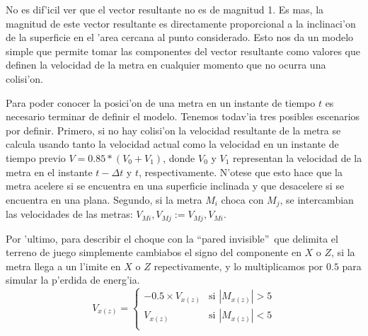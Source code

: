 \documentclass[10pt,letterpaper]{article}
\begin{document}
No es dif'icil ver que el vector resultante no es de magnitud 1. Es
mas, la magnitud de este vector resultante es directamente
proporcional a la inclinaci'on de la superficie en el 'area cercana al
punto considerado. Esto nos da un modelo simple que permite tomar las
componentes del vector resultante como valores que definen la
velocidad de la metra en cualquier momento que no ocurra una colisi'on.

Para poder conocer la posici'on de una metra en un instante de tiempo
$t$ es necesario terminar de definir el modelo. Tenemos todav'ia tres
posibles escenarios por definir. Primero, si no hay colisi'on la
velocidad resultante de la metra se calcula usando tanto la velocidad
actual como la velocidad en un instante de tiempo previo
$V=0.85*(V_0+V_1)$, donde $V_0$ y $V_1$ representan la velocidad de la
metra en el instante $t-\Delta t$ y $t$, respectivamente. N'otese que
esto hace que la metra acelere si se encuentra en una superficie inclinada y
que desacelere si se encuentra en una plana. Segundo, si la metra $M_i$
choca con $M_j$, se intercambian las velocidades de las metras:
$V_{Mi},V_{Mj}:=V_{Mj},V_{Mi}$.

Por 'ultimo, para describir el choque con la ``pared invisible''\ que
delimita el terreno de juego simplemente cambiabos el signo del
componente en $X$ o $Z$, si la metra llega a un l'imite en $X$ o $Z$
repectivamente, y lo multiplicamos por $0.5$ para simular la p'erdida
de energ'ia.
\[
V_{x(z)}=
\begin{cases}
-0.5\times V_{x(z)} & \text{si }|M_{x(z)}| > 5\\
V_{x(z)}            &\text{si } |M_{x(z)}| < 5\\
\end{cases}
\]
\end{document}
